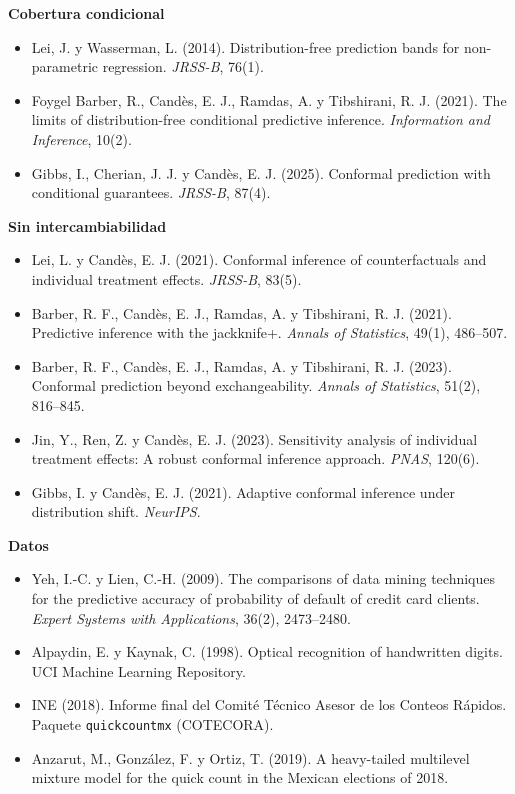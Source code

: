 \documentclass[11pt]{article}
\theoremstyle{plain}
\theoremstyle{definition}
\theoremstyle{remark}
\begin{document}
\textbf{Cobertura condicional}
\begin{itemize}
\item Lei, J. y Wasserman, L. (2014). Distribution-free prediction bands for non-parametric
regression. \emph{JRSS-B}, 76(1).
\item Foygel Barber, R., Candès, E. J., Ramdas, A. y Tibshirani, R. J. (2021). The limits of
distribution-free conditional predictive inference. \emph{Information and Inference}, 10(2).
\item Gibbs, I., Cherian, J. J. y Candès, E. J. (2025). Conformal prediction with conditional
guarantees. \emph{JRSS-B}, 87(4).
\end{itemize}
\textbf{Sin intercambiabilidad}
\begin{itemize}
\item Lei, L. y Candès, E. J. (2021). Conformal inference of counterfactuals and individual treatment
effects. \emph{JRSS-B}, 83(5).
\item Barber, R. F., Candès, E. J., Ramdas, A. y Tibshirani, R. J. (2021). Predictive inference with
the jackknife+. \emph{Annals of Statistics}, 49(1), 486--507.
\item Barber, R. F., Candès, E. J., Ramdas, A. y Tibshirani, R. J. (2023). Conformal prediction beyond
exchangeability. \emph{Annals of Statistics}, 51(2), 816--845.
\item Jin, Y., Ren, Z. y Candès, E. J. (2023). Sensitivity analysis of individual treatment effects: A
robust conformal inference approach. \emph{PNAS}, 120(6).
\item Gibbs, I. y Candès, E. J. (2021). Adaptive conformal inference under distribution shift.
\emph{NeurIPS}.
\end{itemize}
\textbf{Datos}
\begin{itemize}
\item Yeh, I.-C. y Lien, C.-H. (2009). The comparisons of data mining techniques for the predictive
accuracy of probability of default of credit card clients. \emph{Expert Systems with Applications},
36(2), 2473--2480.
\item Alpaydin, E. y Kaynak, C. (1998). Optical recognition of handwritten digits. UCI Machine Learning
Repository.
\item INE (2018). Informe final del Comité Técnico Asesor de los Conteos Rápidos. Paquete
\texttt{quickcountmx} (COTECORA).
\item Anzarut, M., González, F. y Ortiz, T. (2019). A heavy-tailed multilevel mixture model for the
quick count in the Mexican elections of 2018.
\end{itemize}
\end{document}
